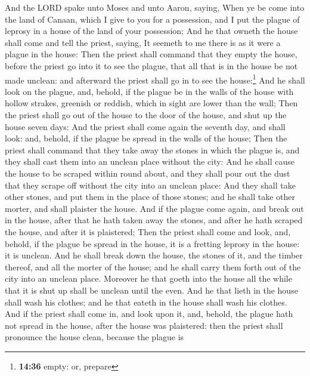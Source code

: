  And the LORD spake unto Moses and unto Aaron, saying,
 When ye be come into the land of Canaan, which I give to
you for a possession, and I put the plague of leprosy in a house of the
land of your possession;  And he that owneth the house
shall come and tell the priest, saying, It seemeth to me there is as it
were a plague in the house:  Then the priest shall
command that they empty the house, before the priest go into it to see
the plague, that all that is in the house be not made unclean: and
afterward the priest shall go in to see the house:\footnote{\textbf{14:36}
  empty: or, prepare}  And he shall look on the plague,
and, behold, if the plague be in the walls of the house with hollow
strakes, greenish or reddish, which in sight are lower than the wall;
 Then the priest shall go out of the house to the door of
the house, and shut up the house seven days:  And the
priest shall come again the seventh day, and shall look: and, behold, if
the plague be spread in the walls of the house;  Then the
priest shall command that they take away the stones in which the plague
is, and they shall cast them into an unclean place without the city:
 And he shall cause the house to be scraped within round
about, and they shall pour out the dust that they scrape off without the
city into an unclean place:  And they shall take other
stones, and put them in the place of those stones; and he shall take
other morter, and shall plaister the house.  And if the
plague come again, and break out in the house, after that he hath taken
away the stones, and after he hath scraped the house, and after it is
plaistered;  Then the priest shall come and look, and,
behold, if the plague be spread in the house, it is a fretting leprosy
in the house: it is unclean.  And he shall break down the
house, the stones of it, and the timber thereof, and all the morter of
the house; and he shall carry them forth out of the city into an unclean
place.  Moreover he that goeth into the house all the
while that it is shut up shall be unclean until the even.
 And he that lieth in the house shall wash his clothes;
and he that eateth in the house shall wash his clothes. 
And if the priest shall come in, and look upon it, and, behold, the
plague hath not spread in the house, after the house was plaistered:
then the priest shall pronounce the house clean, because the plague is
